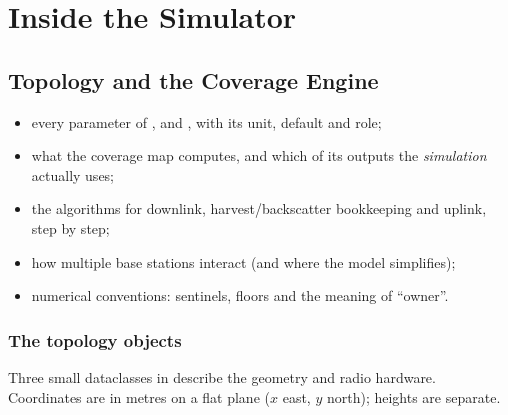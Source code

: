 \part{Inside the Simulator}

\chapter{Topology and the Coverage Engine}
\label{ch:coverage}

\begin{defbox}
\begin{itemize}
 \item every parameter of ,  and , with its unit, default and role;
 \item what the coverage map computes, and which of its outputs the \emph{simulation} actually uses;
 \item the algorithms for downlink, harvest/backscatter bookkeeping and uplink, step by step;
 \item how multiple base stations interact (and where the model simplifies);
 \item numerical conventions: sentinels, floors and the meaning of ``owner''.
\end{itemize}
\end{defbox}

\section{The topology objects}
\label{sec:topo}

Three small dataclasses in  describe the geometry and radio hardware. Coordinates are in metres on a flat plane ($x$ east, $y$ north); heights are separate.

\subsection{\texorpdfstring{}{Node}}

